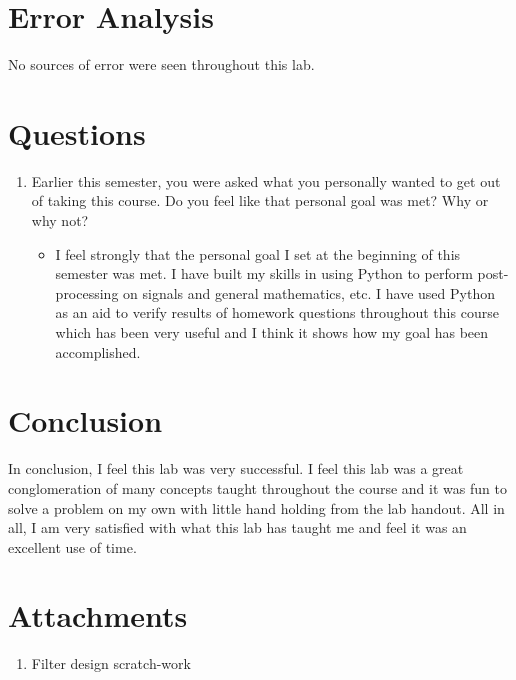 \documentclass[12pt]{report}
\begin{document}
\section{Error Analysis}\label{section: ErAn}
No sources of error were seen throughout this lab.

\section{Questions}\label{section: Questions}
\begin{enumerate}
  \item Earlier this semester, you were asked what you personally wanted to get out of taking this
  course. Do you feel like that personal goal was met? Why or why not?
  \begin{itemize}
    \item I feel strongly that the personal goal I set at the beginning of this semester was met. I have built my skills in using Python
    to perform post-processing on signals and general mathematics, etc. I have used Python as an aid to verify results of homework questions 
    throughout this course which has been very useful and I think it shows how my goal has been accomplished. 
  \end{itemize}
\end{enumerate}
\section{Conclusion}
In conclusion, I feel this lab was very successful. I feel this lab was a great conglomeration of many concepts
taught throughout the course and it was fun to solve a problem on my own with little hand holding from the lab handout.
All in all, I am very satisfied with what this lab has taught me and feel it was an excellent use of time.
\newpage
\thispagestyle{customblank}
\section{Attachments}\label{section: Attachments}
\centering\begin{enumerate}
  \item Filter design scratch-work
\end{enumerate}
\vspace*{\fill}


% 


\end{document}
